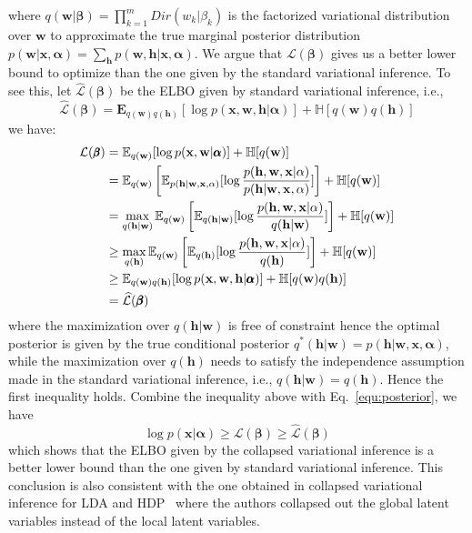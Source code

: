 \documentclass{article} %
\theoremstyle{definition}
\begin{document}
where $q(\mathbf{w}|\pmb\beta) = \prod_{k=1}^m Dir(w_k|\beta_k)$ is the factorized variational distribution over $\mathbf{w}$ to approximate the true marginal posterior distribution $p(\mathbf{w}|\mathbf{x}, \pmb\alpha) = \sum_{\mathbf{h}}p(\mathbf{w}, \mathbf{h}|\mathbf{x},\pmb\alpha)$. We argue that $\mathcal{L}(\pmb\beta)$ gives us a better lower bound to optimize than the one given by the standard variational inference. To see this, let $\widehat{\mathcal{L}}(\pmb\beta)$ be the ELBO given by standard variational inference, i.e., 
$$\widehat{\mathcal{L}}(\pmb\beta) = \mathbf{E}_{q(\mathbf{w})q(\mathbf{h})}[\log p(\mathbf{x}, \mathbf{w}, \mathbf{h}|\pmb\alpha)] + \mathbb{H}[q(\mathbf{w})q(\mathbf{h})]$$
we have:
\begin{align*}
\small
\mathcal{L}(\pmb\beta) &= \mathbb{E}_{q(\mathbf{w})}[\log p(\mathbf{x}, \mathbf{w}|\pmb\alpha)] + \mathbb{H}[q(\mathbf{w})] \nonumber \\
& = \mathbb{E}_{q(\mathbf{w})}\left[\mathbb{E}_{p(\mathbf{h}|\mathbf{w}, \mathbf{x}, \mathbf{\alpha})}[\log \frac{p(\mathbf{h}, \mathbf{w}, \mathbf{x}| \mathbf{\alpha})}{p(\mathbf{h}|\mathbf{w}, \mathbf{x}, \mathbf{\alpha})}]\right] + \mathbb{H}[q(\mathbf{w})] \nonumber\\
& = \max_{q(\mathbf{h}|\mathbf{w})}\mathbb{E}_{q(\mathbf{w})}\left[\mathbb{E}_{q(\mathbf{h}|\mathbf{w})}[\log\frac{p(\mathbf{h}, \mathbf{w}, \mathbf{x}| \mathbf{\alpha})}{q(\mathbf{h}|\mathbf{w})}]\right] + \mathbb{H}[q(\mathbf{w})] \\
&\geq \max_{q(\mathbf{h})}\mathbb{E}_{q(\mathbf{w})}\left[\mathbb{E}_{q(\mathbf{h})}[\log\frac{p(\mathbf{h}, \mathbf{w}, \mathbf{x}| \mathbf{\alpha})}{q(\mathbf{h})}]\right] + \mathbb{H}[q(\mathbf{w})] \\
& \geq \mathbb{E}_{q(\mathbf{w})q(\mathbf{h})}[\log p(\mathbf{x}, \mathbf{w}, \mathbf{h}|\pmb\alpha)] + \mathbb{H}[q(\mathbf{w})q(\mathbf{h})] \nonumber\\
& = \widehat{\mathcal{L}}(\pmb\beta)
\end{align*}
where the maximization over $q(\mathbf{h}|\mathbf{w})$ is free of constraint hence the optimal posterior is given by the true conditional posterior $q^*(\mathbf{h}|\mathbf{w}) = p(\mathbf{h}|\mathbf{w}, \mathbf{x}, \pmb\alpha)$, while the maximization over $q(\mathbf{h})$ needs to satisfy the independence assumption made in the standard variational inference, i.e., $q(\mathbf{h}|\mathbf{w}) = q(\mathbf{h})$. Hence the first inequality holds. Combine the inequality above with Eq.~\ref{equ:posterior}, we have
\begin{equation}
\log p(\mathbf{x}|\pmb\alpha)\geq \mathcal{L}(\pmb\beta)\geq \widehat{\mathcal{L}}(\pmb\beta)
\end{equation}
which shows that the ELBO given by the collapsed variational inference is a better lower bound than the one given by standard variational inference. This conclusion is also consistent with the one obtained in collapsed variational inference for LDA and HDP~\cite{teh2006collapsed,teh2007collapsed} where the authors collapsed out the global latent variables instead of the local latent variables. 
\end{document}
